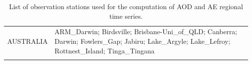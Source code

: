 \documentclass[journal abbreviation, manuscript]{copernicus}
\begin{document}
\begin{table}
\begin{tabularx}{\textwidth}{lX}
  AUSTRALIA & ARM\_Darwin; Birdsville; Brisbane-Uni\_of\_QLD; Canberra; Darwin; Fowlers\_Gap; Jabiru; Lake\_Argyle; Lake\_Lefroy; Rottnest\_Island; Tinga\_Tingana                                                                                                                                                                                                                                                                                                                                                                                                                                                                                                                                                                                                                                                                                                                                                                                                                                                                                                                                                                                                                                                                                                                                                                                                                                                                                                          \\
  \bottomhline
 \end{tabularx}
 \caption{List of observation stations used for the computation of AOD and AE regional time series.}
 \label{table:stations_aerosun}
\end{table}

\clearpage
\end{document}
